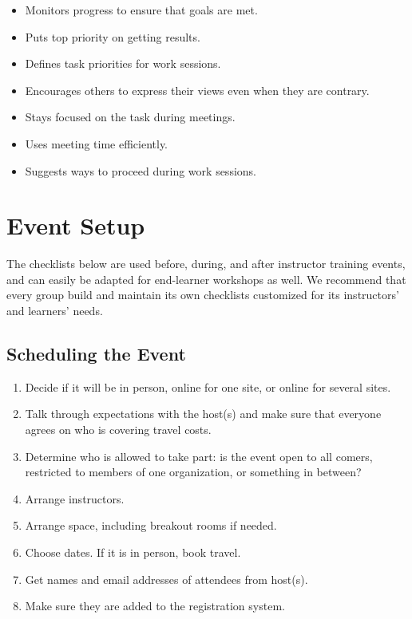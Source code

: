 \begin{itemize}
  \begin{itemize}
  \item
    Monitors progress to ensure that goals are met.
  \item
    Puts top priority on getting results.
  \item
    Defines task priorities for work sessions.
  \item
    Encourages others to express their views even when they are contrary.
  \item
    Stays focused on the task during meetings.
  \item
    Uses meeting time efficiently.
  \item
    Suggests ways to proceed during work sessions.
  \end{itemize}
\end{itemize}

\section{Event Setup}\label{s:checklists-events}

The checklists below are used before, during, and after instructor
training events, and can easily be adapted for end-learner workshops as
well. We recommend that every group build and maintain its own
checklists customized for its instructors' and learners' needs.

\subsection{Scheduling the Event}

\begin{enumerate}
\item
  Decide if it will be in person, online for one site, or online for
  several sites.
\item
  Talk through expectations with the host(s) and make sure that
  everyone agrees on who is covering travel costs.
\item
  Determine who is allowed to take part: is the event open to all
  comers, restricted to members of one organization, or something in
  between?
\item
  Arrange instructors.
\item
  Arrange space, including breakout rooms if needed.
\item
  Choose dates. If it is in person, book travel.
\item
  Get names and email addresses of attendees from host(s).
\item
  Make sure they are added to the registration system.
\end{enumerate}

